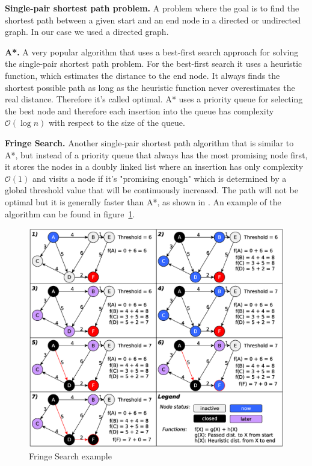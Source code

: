 \documentclass[letterpaper]{article}
\newcommand{\mypar}[1]{{\bf #1.}}
\begin{document}
\mypar{Single-pair shortest path problem}
A problem where the goal is to find the shortest path between a given start and an end node in a directed or undirected graph. In our case we used a directed graph.

\mypar{A*}
A very popular algorithm that uses a best-first search approach for solving the single-pair shortest path problem. For the best-first search it uses a heuristic function, which estimates the distance to the end node. It always finds the shortest possible path as long as the heuristic function never overestimates the real distance. Therefore it's called optimal. A* uses a priority queue for selecting the best node and therefore each insertion into the queue has complexity $\mathcal{O}(\log n)$ with respect to the size of the queue.

\mypar{Fringe Search}
Another single-pair shortest path algorithm that is similar to A*, but instead of a priority queue that always has the most promising node first, it stores the nodes in a doubly linked list where an insertion has only complexity $\mathcal{O}(1)$ and visits a node if it's "promising enough" which is determined by a global threshold value that will be continuously increased. The path will not be optimal but it is generally faster than A*, as shown in \cite{fringe:05}. An example of the algorithm can be found in figure~\ref{fig:algo}.
\begin{figure}[h]\centering
  \includegraphics[scale=0.245]{fringe_rep.eps}
  \caption{Fringe Search example \label{fig:algo}}
\end{figure}
\end{document}
